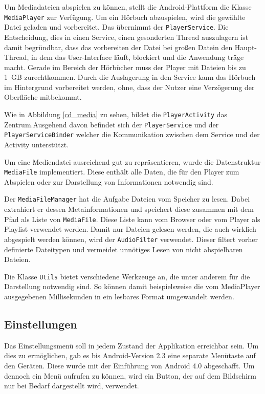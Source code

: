 Um Mediadateien abspielen zu können, stellt die Android-Plattform die Klasse \verb+MediaPlayer+ zur Verfügung. Um ein Hörbuch abzuspielen, wird die gewählte Datei geladen und vorbereitet. Das übernimmt der \verb+PlayerService+. Die Entscheidung, dies in einen Service, einen gesonderten Thread auszulagern ist damit begründbar, dass das vorbereiten der Datei bei großen Datein den Haupt-Thread, in dem das User-Interface läuft, blockiert und die Anwendung träge macht. Gerade im Bereich der Hörbücher muss der Player mit Dateien bis zu \SI{1}{GB} zurechtkommen. Durch die Auslagerung in den Service kann das Hörbuch im Hintergrund vorbereitet werden, ohne, dass der Nutzer eine Verzögerung der Oberfläche mitbekommt.

Wie in Abbildung \ref{cd_media} zu sehen, bildet die \verb+PlayerActivity+ das Zentrum.Ausgehend davon befindet sich der \verb+PlayerService+ und der \verb+PlayerServiceBinder+ welcher die Kommunikation zwischen dem Service und der Activity unterstützt.

Um eine Mediendatei ausreichend gut zu repräsentieren, wurde die Datenstruktur \verb+MediaFile+ implementiert. Diese enthält alle Daten, die für den Player zum Abspielen oder zur Darstellung von Informationen notwendig sind. 

Der \verb+MediaFileManager+ hat die Aufgabe Dateien vom Speicher zu lesen. Dabei extrahiert er dessen Metainformationen und speichert diese zusammen mit dem Pfad als Liste von \verb+MediaFile+. Diese Liste kann vom Browser oder vom Player als Playlist verwendet werden. Damit nur Dateien gelesen werden, die auch wirklich abgespielt werden können, wird der \verb+AudioFilter+ verwendet. Dieser filtert vorher definierte Dateitypen und vermeidet unnötiges Lesen von nicht abspielbaren Dateien.

Die Klasse \verb+Utils+ bietet verschiedene Werkzeuge an, die unter anderem für die Darstellung notwendig sind. So können damit beispielsweise die vom MediaPlayer ausgegebenen Millisekunden in ein lesbares Format umgewandelt werden.

\subsection{Einstellungen}

Das Einstellungsmenü soll in jedem Zustand der Applikation erreichbar sein. Um dies zu ermöglichen, gab es bis Android-Version 2.3 eine separate Menütaste auf den Geräten. Diese wurde mit der Einführung von Android 4.0 abgeschafft. Um dennoch ein Menü aufrufen zu können, wird ein Button, der auf dem Bildschirm nur bei Bedarf dargestellt wird, verwendet.

